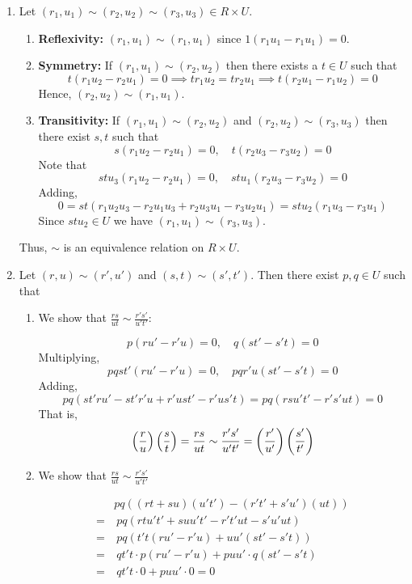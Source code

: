 \documentclass[Notebook.tex]{subfiles}
\begin{document}
\begin{solution}
	\bbni

	\begin{enumerate}
		\item Let $(r_1, u_1) \sim (r_2, u_2) \sim (r_3, u_3) \in R \times U$. 
		
		\begin{enumerate}
			\item \textbf{Reflexivity:} $(r_1, u_1) \sim (r_1, u_1)$ since $1(r_1u_1 - r_1u_1) = 0$. 
			\item \textbf{Symmetry:} If $(r_1, u_1) \sim (r_2, u_2)$ then there exists a $t \in U$ such that 
			\[t(r_1u_2 - r_2u_1) = 0 \implies tr_1u_2 = tr_2u_1 \implies t(r_2u_1 - r_1u_2) = 0\]
			Hence, $(r_2, u_2) \sim (r_1, u_1)$.  

			\item \textbf{Transitivity:} If $(r_1, u_1) \sim (r_2, u_2)$ and $(r_2, u_2) \sim (r_3, u_3)$ then there exist $s, t$ such that 
			\[s(r_1u_2 - r_2u_1) = 0, \quad t(r_2u_3 - r_3u_2) = 0\]
			Note that 
			\[stu_3(r_1u_2 - r_2u_1) = 0, \quad stu_1(r_2u_3 - r_3u_2) = 0\]
			Adding, 
			\[0 = st(r_1u_2u_3 - r_2u_1u_3 + r_2u_3u_1 - r_3u_2u_1) = stu_2(r_1u_3 - r_3u_1)\]
			Since $stu_2 \in U$ we have $(r_1, u_1) \sim (r_3, u_3)$.  
		\end{enumerate}
		Thus, $\sim$ is an equivalence relation on $R \times U$. 

		\item Let $(r, u) \sim (r', u')$ and $(s, t) \sim (s', t')$. Then there exist $p, q \in U$ such that 
		
		\begin{enumerate}
			\item We show that $\frac{rs}{ut} \sim \frac{r's'}{u't'}$: 

			\[p(ru' - r'u) = 0, \quad q(st' - s't) = 0\]
			Multiplying, 
			\[pqst'(ru' - r'u) = 0, \quad pqr'u(st' - s't) = 0\]
			Adding, 
			\[pq(st'ru' - st'r'u + r'ust' - r'us't)  = pq ( rsu't' - r's'ut)= 0\]
			That is, 
			\begin{align*}
				\left(\frac{r}{u}\right) \left(\frac{s}{t}\right) = \frac{rs}{ut} \sim \frac{r's'}{u't'} = \left(\frac{r'}{u'}\right)\left(\frac{s'}{t'}\right) 
			\end{align*}




			\item We show that $\frac{rs}{ut} \sim \frac{r's'}{u't'}$
		
			\begin{align*}
				&pq\left((rt + su)(u't') - (r't' + s'u')(ut)\right) \\
				= &\ pq\left(rtu't' + suu't' - r't'ut - s'u'ut\right) \\
				= &\ pq\left(t't(ru' - r'u) + uu'(st' - s't)\right) \\
				= &\ qt't \cdot p(ru' - r'u) + pu u' \cdot q(st' - s't) \\
				= &\ qt't \cdot 0 + puu' \cdot 0 = 0
			\end{align*}


\end{enumerate}
\end{enumerate}
\end{solution}
\end{document}
